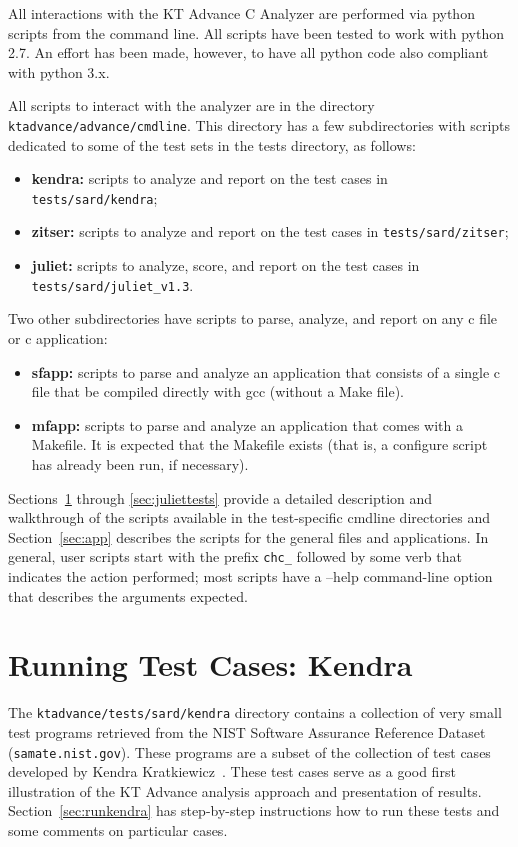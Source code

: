 \documentclass[11pt]{article}
\begin{document}
All interactions with the KT Advance C Analyzer are performed via python scripts from the
command line. All scripts have been tested to work with python 2.7. An effort has been
made, however, to have all python code also compliant with python 3.x.

All scripts to interact with the analyzer are in the directory 
{\tt ktadvance/advance/cmdline}. 
This directory has a few subdirectories with scripts dedicated to some of the test 
sets in the tests directory, as follows:
\begin{itemize}
\item {\bf kendra:} scripts to analyze and report on the test cases in 
 {\tt tests/sard/kendra};
\item {\bf zitser:} scripts to analyze and report on the test cases in
 {\tt tests/sard/zitser};
\item {\bf juliet:} scripts to analyze, score, and report on the test cases in
 {\tt tests/sard/juliet\_v1.3}.
\end{itemize}

Two other subdirectories have scripts to parse, analyze, and report on any c file or
c application:
\begin{itemize}
\item {\bf sfapp:} scripts to parse and analyze an application that consists of a single
  c file that be compiled directly with gcc (without a Make file). 
\item {\bf mfapp:} scripts to parse and analyze an application that comes with a Makefile.
  It is expected that the Makefile exists (that is, a configure script has already been
  run, if necessary).
\end{itemize}

Sections~\ref{sec:kendratests} through \ref{sec:juliettests} provide a detailed 
description and walkthrough of the scripts available in
the test-specific cmdline directories and Section~\ref{sec:app} describes the scripts
for the general files and applications. In general, user scripts start with the 
prefix {\tt chc\_} followed by some verb that indicates the action performed; most 
scripts have a --help command-line
option that describes the arguments expected.

\section{Running Test Cases: Kendra}
\label{sec:kendratests}

The {\tt ktadvance/tests/sard/kendra} directory contains a collection of very small test
programs retrieved from the NIST Software Assurance Reference Dataset ({\tt samate.nist.gov}).
These programs are a subset of the collection of test cases developed by 
Kendra Kratkiewicz~\cite{Kratkiewicz/05/Using}. These test cases serve as a good first 
illustration of
the KT Advance analysis approach and presentation of results. 
Section~\ref{sec:runkendra} has step-by-step instructions how to run these tests
and some comments on particular cases.
\end{document}
